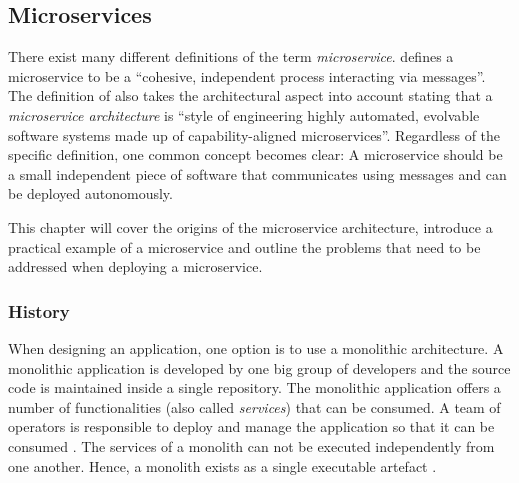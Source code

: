 
\subsection{Microservices}%
\label{sub:Microservices}

There exist many different definitions of the term \textit{microservice}.
\autocite{DragoniMicroservicesyesterdaytoday2016} defines a microservice to be
a \enquote{cohesive, independent process interacting via messages}. The
definition of \autocite{MikeAmundsenMicroserviceArchitecture2016} also takes
the architectural aspect into account stating that a \textit{microservice
architecture} is \enquote{style of engineering highly automated, evolvable
software systems made up of capability-aligned microservices}. Regardless of
the specific definition, one common concept becomes clear: A microservice
should be a small independent piece of software that communicates using
messages and can be deployed autonomously.

This chapter will cover the origins of the microservice architecture, introduce
a practical example of a microservice and outline the problems that need to be
addressed when deploying a microservice.

\subsubsection{History}%
\label{ssub:History}

When designing an application, one option is to use a monolithic architecture.
A monolithic application is developed by one big group of developers and the
source code is maintained inside a single repository. The monolithic
application offers a number of functionalities (also called \textit{services})
that can be consumed. A team of operators is responsible to deploy and manage
the application so that it can be consumed \autocite[p.
584]{VillamizarEvaluatingmonolithicmicroservice2015}. The services of a
monolith can not be executed independently from one another. Hence, a monolith
exists as a single executable artefact \autocite[p.
1]{DragoniMicroservicesyesterdaytoday2016}.

